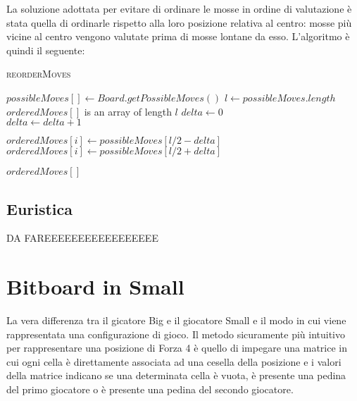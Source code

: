 \documentclass[a4paper]{article}
\begin{document}
La soluzione adottata per evitare di ordinare le mosse in ordine di valutazione
è stata quella di ordinarle rispetto alla loro posizione relativa al centro: 
mosse più vicine al centro vengono valutate prima di mosse lontane da esso.
L'algoritmo è quindi il seguente:

\begin{algorithm}
  \caption{\textsc{reorderMoves}}
 \begin{algorithmic}
   \State $possibleMoves[] \gets Board.getPossibleMoves()$
     \State $l \gets possibleMoves.length$
     \State $orderedMoves[]$ is an array of length $l$
     \State $delta \gets 0$
     \\
         \State $delta \gets delta + 1$

         \State $orderedMoves[i] \gets possibleMoves[l / 2 - delta]$
       \Else
         \State $orderedMoves[i] \gets possibleMoves[l / 2 + delta]$
       \EndIf
     \EndFor

     \State \Return $orderedMoves[]$
   \EndFunction
 \end{algorithmic} 
\end{algorithm}

\subsection{Euristica}
\begin{center}
  DA FAREEEEEEEEEEEEEEEEE
\end{center}

\section{Bitboard in Small}
\label{sec_bitboard}
La vera differenza tra il gicatore Big e il giocatore Small e il modo in cui
viene rappresentata una configurazione di gioco. Il metodo sicuramente più
intuitivo per rappresentare una posizione di Forza 4 è quello di impegare una 
matrice in cui ogni cella è direttamente associata ad una cesella della 
posizione e i valori della matrice indicano se una determinata cella è vuota, 
è presente una pedina del primo giocatore o è presente una pedina del secondo 
giocatore.
\end{document}

